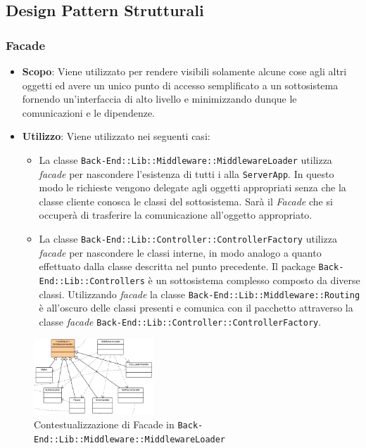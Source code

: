 \subsection{Design Pattern Strutturali}

\subsubsection{Facade}

\begin{itemize}

	\item \textbf{Scopo}: Viene utilizzato per rendere visibili solamente alcune cose agli altri oggetti ed avere un unico punto di accesso semplificato a un sottosistema fornendo un'interfaccia di alto livello e minimizzando dunque le comunicazioni e le dipendenze.
	\item \textbf{Utilizzo}: Viene utilizzato nei seguenti casi:
	\begin{itemize}
	
		\item La classe \texttt{Back-End::Lib::Middleware::MiddlewareLoader} utilizza \textit{facade} per nascondere l'esistenza di tutti i  alla \texttt{ServerApp}. In questo modo le richieste vengono delegate agli oggetti appropriati senza che la classe cliente conosca le classi del sottosistema. Sarà il \textit{Facade} che si occuperà di trasferire la comunicazione all'oggetto appropriato.
		\item La classe \texttt{Back-End::Lib::Controller::ControllerFactory} utilizza \textit{facade} per nascondere le classi interne, in modo analogo a quanto effettuato dalla classe descritta nel punto precedente. Il package \texttt{Back-End::Lib::Controllers} è un sottosistema complesso composto da diverse classi. Utilizzando \textit{facade} la classe \texttt{Back-End::Lib::Middleware::Routing} è all'oscuro delle classi presenti e comunica con il pacchetto attraverso la classe \textit{facade} \texttt{Back-End::Lib::Controller::ControllerFactory}.
		
	\end{itemize}
\end{itemize}

\begin{figure}[H]
\centering \includegraphics[width=0.4\textwidth]{patterns/contestualizzazione/facade1.png}
\caption{Contestualizzazione di Facade in \texttt{Back-End::Lib::Middleware::MiddlewareLoader}}
\label{fig:mvc}
\end{figure}

